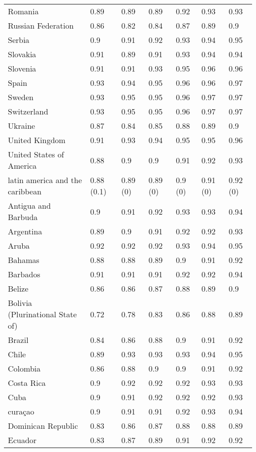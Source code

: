 \begin{longtable}[t]{lllllll}
Romania & 0.89 & 0.89 & 0.89 & 0.92 & 0.93 & 0.93\\
Russian Federation & 0.86 & 0.82 & 0.84 & 0.87 & 0.89 & 0.9\\
Serbia & 0.9 & 0.91 & 0.92 & 0.93 & 0.94 & 0.95\\
Slovakia & 0.91 & 0.89 & 0.91 & 0.93 & 0.94 & 0.94\\
Slovenia & 0.91 & 0.91 & 0.93 & 0.95 & 0.96 & 0.96\\
\addlinespace
Spain & 0.93 & 0.94 & 0.95 & 0.96 & 0.96 & 0.97\\
Sweden & 0.93 & 0.95 & 0.95 & 0.96 & 0.97 & 0.97\\
Switzerland & 0.93 & 0.95 & 0.95 & 0.96 & 0.97 & 0.97\\
Ukraine & 0.87 & 0.84 & 0.85 & 0.88 & 0.89 & 0.9\\
United Kingdom & 0.91 & 0.93 & 0.94 & 0.95 & 0.95 & 0.96\\
\addlinespace
United States of America & 0.88 & 0.9 & 0.9 & 0.91 & 0.92 & 0.93\\
latin america and the caribbean & 0.88 (0.1) & 0.89 (0) & 0.89 (0) & 0.9 (0) & 0.91 (0) & 0.92 (0)\\
Antigua and Barbuda & 0.9 & 0.91 & 0.92 & 0.93 & 0.93 & 0.94\\
Argentina & 0.89 & 0.9 & 0.91 & 0.92 & 0.92 & 0.93\\
Aruba & 0.92 & 0.92 & 0.92 & 0.93 & 0.94 & 0.95\\
\addlinespace
Bahamas & 0.88 & 0.88 & 0.89 & 0.9 & 0.91 & 0.92\\
Barbados & 0.91 & 0.91 & 0.91 & 0.92 & 0.92 & 0.94\\
Belize & 0.86 & 0.86 & 0.87 & 0.88 & 0.89 & 0.9\\
Bolivia (Plurinational State of) & 0.72 & 0.78 & 0.83 & 0.86 & 0.88 & 0.89\\
Brazil & 0.84 & 0.86 & 0.88 & 0.9 & 0.91 & 0.92\\
\addlinespace
Chile & 0.89 & 0.93 & 0.93 & 0.93 & 0.94 & 0.95\\
Colombia & 0.86 & 0.88 & 0.9 & 0.9 & 0.91 & 0.92\\
Costa Rica & 0.9 & 0.92 & 0.92 & 0.92 & 0.93 & 0.93\\
Cuba & 0.9 & 0.91 & 0.92 & 0.92 & 0.92 & 0.93\\
curaçao & 0.9 & 0.91 & 0.91 & 0.92 & 0.93 & 0.94\\
\addlinespace
Dominican Republic & 0.83 & 0.86 & 0.87 & 0.88 & 0.88 & 0.89\\
Ecuador & 0.83 & 0.87 & 0.89 & 0.91 & 0.92 & 0.92\\

\end{longtable}
